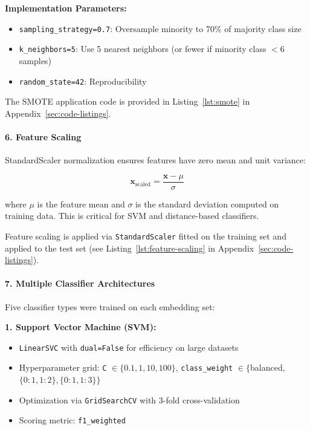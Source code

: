 \documentclass[11pt, titlepage, bibliography=totoc]{scrreprt}
\begin{document}
\textbf{Implementation Parameters:}
\begin{itemize}
    \item \texttt{sampling\_strategy=0.7}: Oversample minority to 70\% of majority class size
    \item \texttt{k\_neighbors=5}: Use 5 nearest neighbors (or fewer if minority class $< 6$ samples)
    \item \texttt{random\_state=42}: Reproducibility
\end{itemize}

The SMOTE application code is provided in Listing~\ref{lst:smote} in Appendix~\ref{sec:code-listings}.

\paragraph{6. Feature Scaling}
StandardScaler normalization ensures features have zero mean and unit variance:

\begin{equation}
\mathbf{x}_{\text{scaled}} = \frac{\mathbf{x} - \mu}{\sigma}
\end{equation}

where $\mu$ is the feature mean and $\sigma$ is the standard deviation computed on training data. This is critical for SVM and distance-based classifiers.

Feature scaling is applied via \texttt{StandardScaler} fitted on the training set and applied to the test set (see Listing~\ref{lst:feature-scaling} in Appendix~\ref{sec:code-listings}).

\paragraph{7. Multiple Classifier Architectures}
Five classifier types were trained on each embedding set:

\textbf{1. Support Vector Machine (SVM):}
\begin{itemize}
    \item \texttt{LinearSVC} with \texttt{dual=False} for efficiency on large datasets
    \item Hyperparameter grid: \texttt{C} $\in \{0.1, 1, 10, 100\}$, \texttt{class\_weight} $\in \{$balanced, $\{0:1, 1:2\}, \{0:1, 1:3\}\}$
    \item Optimization via \texttt{GridSearchCV} with 3-fold cross-validation
    \item Scoring metric: \texttt{f1\_weighted}
\end{itemize}
\end{document}

